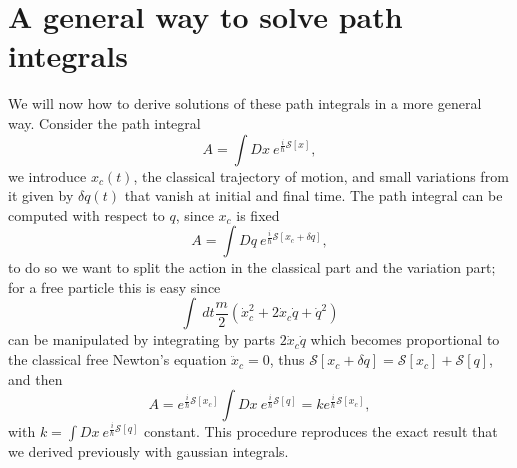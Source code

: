 \section{A general way to solve path integrals}
We will now how to derive solutions of these path integrals in a more general way. Consider the path integral
\begin{equation*}
    A=\int Dx\ e^{\frac{i}{\hslash}\mathcal{S} [x]},
\end{equation*}
we introduce $x_{c}(t)$, the classical trajectory of motion, and small variations from it given by $\delta q(t)$ that vanish at initial and final time. The path integral can be computed with respect to $q$, since $x_c$ is fixed
\begin{equation*}
    A=\int Dq\ e^{\frac{i}{\hslash}\mathcal{S} [x_c+\delta q]},
\end{equation*}
to do so we want to split the action in the classical part and the variation part; for a free particle this is easy since\begin{equation*}
    \int\ dt \frac{m}{2}(\dot{x}_c^2+2\dot{x}_c\dot{q}+\dot{q}^2)
\end{equation*}
can be manipulated by integrating by parts $2\dot{x}_c\dot{q}$ which becomes proportional to the classical free Newton's equation $\ddot{x}_c=0$, thus $\mathcal{S} [x_c+\delta q]=\mathcal{S} [x_c]+\mathcal{S} [q]$, and then
\begin{equation*}
    A=e^{\frac{i}{\hslash}\mathcal{S} [x_c]}\int Dx\ e^{\frac{i}{\hslash}\mathcal{S} [q]}=ke^{\frac{i}{\hslash}\mathcal{S} [x_c]},
\end{equation*}
with $k=\int Dx\ e^{\frac{i}{\hslash}\mathcal{S} [q]}$ constant. This procedure reproduces the exact result that we derived previously with gaussian integrals.